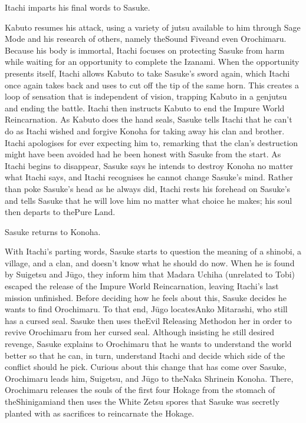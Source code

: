 \documentclass[a4paper,12pt]{article}
\begin{document}
Itachi imparts his final words to Sasuke.\\ \par \vspace{0.5cm}

Kabuto resumes his attack, using a variety of jutsu available to him through Sage Mode and his research of others, namely theSound Fiveand even Orochimaru. Because his body is immortal, Itachi focuses on protecting Sasuke from harm while waiting for an opportunity to complete the Izanami. When the opportunity presents itself, Itachi allows Kabuto to take Sasuke's sword again, which Itachi once again takes back and uses to cut off the tip of the same horn. This creates a loop of sensation that is independent of vision, trapping Kabuto in a genjutsu and ending the battle. Itachi then instructs Kabuto to end the Impure World Reincarnation. As Kabuto does the hand seals, Sasuke tells Itachi that he can't do as Itachi wished and forgive Konoha for taking away his clan and brother. Itachi apologises for ever expecting him to, remarking that the clan's destruction might have been avoided had he been honest with Sasuke from the start. As Itachi begins to disappear, Sasuke says he intends to destroy Konoha no matter what Itachi says, and Itachi recognises he cannot change Sasuke's mind. Rather than poke Sasuke's head as he always did, Itachi rests his forehead on Sasuke's and tells Sasuke that he will love him no matter what choice he makes; his soul then departs to thePure Land.\\ \par \vspace{0.5cm}

Sasuke returns to Konoha.\\ \par \vspace{0.5cm}

With Itachi's parting words, Sasuke starts to question the meaning of a shinobi, a village, and a clan, and doesn't know what he should do now. When he is found by Suigetsu and Jūgo, they inform him that Madara Uchiha (unrelated to Tobi) escaped the release of the Impure World Reincarnation, leaving Itachi's last mission unfinished. Before deciding how he feels about this, Sasuke decides he wants to find Orochimaru. To that end, Jūgo locatesAnko Mitarashi, who still has a cursed seal. Sasuke then uses theEvil Releasing Methodon her in order to revive Orochimaru from her cursed seal. Although insisting he still desired revenge, Sasuke explains to Orochimaru that he wants to understand the world better so that he can, in turn, understand Itachi and decide which side of the conflict should he pick. Curious about this change that has come over Sasuke, Orochimaru leads him, Suigetsu, and Jūgo to theNaka Shrinein Konoha. There, Orochimaru releases the souls of the first four Hokage from the stomach of theShinigamiand then uses the White Zetsu spores that Sasuke was secretly planted with as sacrifices to reincarnate the Hokage.\\ \par \vspace{0.5cm}
\end{document}
